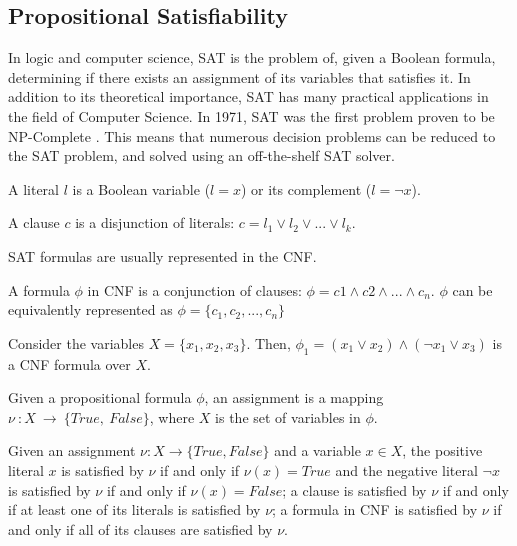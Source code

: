 \subsection{Propositional Satisfiability}

In logic and computer science, \ac{SAT} is the problem of, given a Boolean formula, determining if there exists an assignment of its variables that satisfies it.
%
In addition to its theoretical importance, \ac{SAT} has many practical applications in the field of Computer Science. In 1971, \ac{SAT} was the first problem proven to be NP-Complete \cite{DBLP:conf/stoc/Cook71}. This means that numerous decision problems can be reduced to the \ac{SAT} problem, and solved using an off-the-shelf \ac{SAT} solver.

\begin{definition}[Literal]
A literal \(l\) is a Boolean variable (\(l = x\)) or its complement (\(l = \neg x\)).
\end{definition}

\begin{definition}[Clause]
A clause \(c\) is a disjunction of literals: \(c = l_1 \lor l_2 \lor ... \lor l_k\).
\end{definition}

\noindent
\ac{SAT} formulas are usually represented in the \acf{CNF}. 

\begin{definition}
A formula \(\phi\) in \ac{CNF} is a conjunction of clauses: \(\phi = c1 \land c2 \land ... \land c_n\). \(\phi\) can be equivalently represented as \(\phi = \{c_1, c_2, ..., c_n\}\)
\end{definition}

\begin{example}\label{ex:CNF_formula}
Consider the variables \(X = \{x_1, x_2, x_3\}\). Then, \(\phi_1 = (x_1 \lor x_2) \land (\neg x_1 \lor x_3)\) is a \ac{CNF} formula over \(X\).
\end{example}

\begin{definition}[Assignment]
Given a propositional formula \(\phi\), an assignment is a mapping \(\nu~: X~\rightarrow~\{\textit{True},~\textit{False}\}\), where \(X\) is the set of variables in \(\phi\).
\end{definition}

\noindent
Given an assignment \(\nu : X \rightarrow \{\textit{True}, \textit{False}\}\) and a variable \(x \in X\), the positive literal \(x\) is satisfied by \(\nu\) if and only if \(\nu(x) = \textit{True}\) and the negative literal \(\neg x\) is satisfied by \(\nu\) if and only if \(\nu(x) = \textit{False}\); a clause is satisfied by \(\nu\) if and only if at least one of its literals is satisfied by \(\nu\); a formula in CNF is satisfied by \(\nu\) if and only if all of its clauses are satisfied by \(\nu\).

